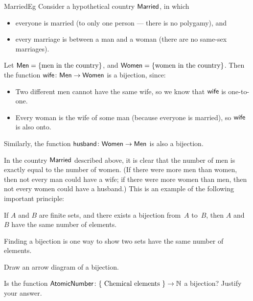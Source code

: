  \begin{example}{MarriedEg}
 Consider a hypothetical country $\sf{Married}$, in which 
 \begin{itemize}
 \item everyone is married (to only one person --- there is no polygamy),
 and
 \item every marriage is between a man and a woman (there are no same-sex marriages). 
 \end{itemize}
Let ${\sf{M}en} = \{\text{men in the country}\}$, and 
${\sf{W}omen} = \{\text{women in the country}\}$.
Then the function $\sf{wife} \colon \sf{Men} \to \sf{Women}$ is a bijection, since:
\begin{itemize}
 \item Two different men cannot have the same wife, so we know that $\sf{wife}$ is one-to-one. 
 \item Every woman is the wife of some man (because everyone is married), so $\sf{wife}$ is also onto.
 \end{itemize}
Similarly, the function $\sf{husband} \colon \sf{Women} \to \sf{Men}$ is also a bijection.
 \end{example}

\begin{rem}
In the country $\sf{Married}$ described above, it is clear that the number of men is exactly equal to the number of women. (If there were more men than women, then not every man could have a wife; if there were more women than men, then not every women could have a husband.) This is an example of the following important principle:
	
\begin{center}
If $A$ and $B$ are finite sets, and there exists a bijection from~$A$ to~$B$, 
	then $A$ and~$B$ have
	 the same number of elements.
\end{center}

Finding a bijection is one way to show two sets have the same number of elements.
\end{rem}

\begin{exercise}{}
Draw an arrow diagram of a bijection.
\end{exercise}

\begin{exercise}{}
Is the function $\sf{Atomic Number} \colon \{ \mbox{ Chemical elements } \} \to \mathbb{N}$ a bijection?  Justify your answer.
\end{exercise}


